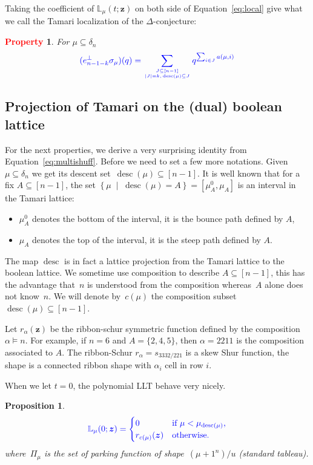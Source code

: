 \documentclass[12pt]{amsart}
\newcommand{\blue}[1]{\textcolor{blue}{#1}}
\newcommand{\red}[1]{\textcolor{red}{#1}}
\theoremstyle{plain}
\newtheorem{proposition}[theorem]{Proposition}
\newtheorem{property}{\red{Property}}
\theoremstyle{definition}
\theoremstyle{remark}
\newcommand{\Zvar}{{\bm z}}
\newcommand{\desc}{\mathop{\mathrm{desc}}}
\newcommand{\set}[2]{\left\{ #1 \;\middle|\; #2 \right\}} %
\begin{document}
Taking the coefficient of ${\mathbb L}_{\mu}(t;\Zvar)$ on both side of Equation~\eqref{eq:local} give what we call the Tamari localization of the $\Delta$-conjecture:

\begin{property}\label{P:localDelta}
For $\mu\subseteq\delta_n$
\[
\blue{(e_{n-1-k}^{\perp}\sigma_{\mu})(q) = \sum_{J\subseteq [n-1] \atop |J|=k, \, \desc(\mu)\subseteq J} q^{\sum_{i\in J} a(\mu,i)} 
}
\]
\end{property}

\subsection{Projection of Tamari on the (dual) boolean lattice}

For the next properties, we derive a very surprising identity from Equation~\eqref{eq:multishuff}. 
Before we need to set a few more notations.
Given $\mu \subseteq \delta_n$ we  get its descent set~$\desc(\mu) \subseteq [n-1]$.
It is well known that for a fix $A\subseteq [n-1]$, the set $\set{\mu}{\desc(\mu) = A} = [\mu_A^0, \mu_A]$ is an interval in the Tamari lattice:
\begin{itemize}
\item $\mu_A^0$ denotes the bottom of the interval, it is the bounce path defined by $A$,
\item $\mu_A$ denotes the top of the interval, it is the steep path defined by $A$.
\end{itemize}
The map $\desc$ is in fact a lattice projection from the Tamari lattice to the boolean lattice.
We sometime use composition to describe $A\subseteq[n-1]$, this has the advantage that~$n$ is understood from the composition whereas~$A$ alone does not know~$n$.
We will denote by~$c(\mu)$ the composition subset~$\desc(\mu)\subseteq [n-1]$.

Let $r_{\alpha}(\Zvar)$ be the ribbon-schur symmetric function defined by the composition $\alpha\models n$. 
For example, if $n = 6$ and $A = \{2,4,5\}$, then $\alpha = 2211$ is the composition associated to $A$.
The ribbon-Schur $r_\alpha = s_{3332/221}$ is a skew Shur function, the shape is a connected ribbon shape with $\alpha_i$ cell in row $i$.

When we let $t=0$, the polynomial LLT behave very nicely.

\begin{proposition}
\begin{equation}\label{eq:LLT0}
\blue{
{\mathbb L}_\mu(0;\Zvar) = 
\begin{cases} 0 & \text{\rm if $\mu<\mu_{\desc(\mu)}$,} \\ r_{c(\mu)}(\Zvar) & \text{\rm otherwise}.\end{cases}
}
\end{equation}
where~$\Pi_\mu$ is the set of parking function of shape~$(\mu+1^n)/u$ (standard tableau).
\end{proposition}      
\end{document}
